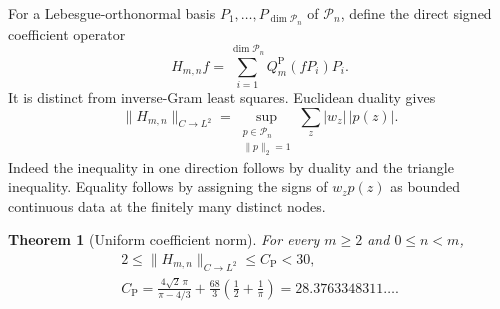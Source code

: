 \documentclass[preprint,12pt,a4paper]{elsarticle}
\newtheorem{theorem}{Theorem}[section]
\theoremstyle{remark}
\newcommand{\Pa}{\mathrm P}
\begin{document}
For a Lebesgue-orthonormal basis $P_1,\ldots,P_{\dim\mathcal P_n}$ of $\mathcal P_n$,
define the direct signed coefficient operator
\[
 H_{m,n}f=\sum_{i=1}^{\dim\mathcal P_n}Q_m^\Pa(fP_i)P_i.
\]
It is distinct from inverse-Gram least squares. Euclidean duality gives
\begin{equation}\label{eq:padua-L1-norm}
 \|H_{m,n}\|_{C\to L^2}
 =\sup_{\substack{p\in\mathcal P_n\\\|p\|_2=1}}
          \sum_z|w_z|\,|p(z)|.
\end{equation}
Indeed the inequality in one direction follows by duality and the
triangle inequality. Equality follows by assigning the signs of
$w_zp(z)$ as bounded continuous data at the finitely many distinct nodes.

\begin{theorem}[Uniform coefficient norm]\label{thm:padua-operator}
For every $m\ge2$ and $0\le n<m$,
\[
 \begin{gathered}
 2\le\|H_{m,n}\|_{C\to L^2}\le C_{\Pa}<30,\\
 C_{\Pa}=\frac{4\sqrt2\,\pi}{\pi-4/3}
       +\frac{68}{3}\left(\frac12+\frac1\pi\right)
       =28.3763348311\ldots.
 \end{gathered}
\]
\end{theorem}
\end{document}
